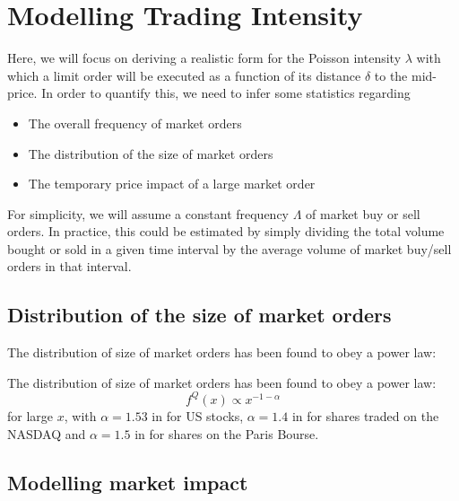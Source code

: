 \section{Modelling Trading Intensity}\label{sec:3.6}

Here, we will focus on deriving a realistic form for the Poisson intensity
$\lambda$ with which a limit order will be executed as a function of its
distance $\delta$ to the mid-price. In order to quantify this, we need 
to infer some statistics regarding
\begin{itemize}
    \item The overall frequency of market orders
    \item The distribution of the size of market orders
    \item The temporary price impact of a large market order
\end{itemize}
For simplicity, we will assume a constant frequency $\Lambda$ of market
buy or sell orders. In practice, this could be estimated by simply 
dividing the total volume bought or sold in a given time interval 
by the average volume of market buy/sell orders in that interval. 

\subsection*{Distribution of the size of market orders}

The distribution of size of market orders has been found to obey a 
power law:
\begin{theorem}
    The distribution of size of market orders has been found to obey a 
    power law:
    \begin{equation}\label{eq:3.13}
        f^{Q}(x)\propto x^{-1-\alpha}
    \end{equation}
    for large $x$, with $\alpha=1.53$ in \cite{Gopi2000} for US stocks,
    $\alpha=1.4$ in \cite{Maslov2001} for shares traded on the NASDAQ
    and $\alpha=1.5$ in \cite{Gabaix2006} for shares on the Paris Bourse.
\end{theorem}

\subsection*{Modelling market impact}

